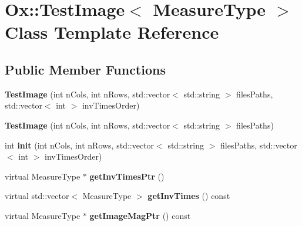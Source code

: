 \hypertarget{class_ox_1_1_test_image}{\section{Ox\-:\-:Test\-Image$<$ Measure\-Type $>$ Class Template Reference}
\label{class_ox_1_1_test_image}
}
\subsection*{Public Member Functions}
\begin{DoxyCompactItemize}
\item 
\hypertarget{class_ox_1_1_test_image_a3b5ceff06d34b2ebd4a4ff215e156088}{{\bfseries Test\-Image} (int n\-Cols, int n\-Rows, std\-::vector$<$ std\-::string $>$ files\-Paths, std\-::vector$<$ int $>$ inv\-Times\-Order)}\label{class_ox_1_1_test_image_a3b5ceff06d34b2ebd4a4ff215e156088}

\item 
\hypertarget{class_ox_1_1_test_image_a794b321a180a2b19d88efc316e0d47aa}{{\bfseries Test\-Image} (int n\-Cols, int n\-Rows, std\-::vector$<$ std\-::string $>$ files\-Paths)}\label{class_ox_1_1_test_image_a794b321a180a2b19d88efc316e0d47aa}

\item 
\hypertarget{class_ox_1_1_test_image_aa802ece1484e88fd748b462c6e2a6cf9}{int {\bfseries init} (int n\-Cols, int n\-Rows, std\-::vector$<$ std\-::string $>$ files\-Paths, std\-::vector$<$ int $>$ inv\-Times\-Order)}\label{class_ox_1_1_test_image_aa802ece1484e88fd748b462c6e2a6cf9}

\item 
\hypertarget{class_ox_1_1_test_image_a6dda2e0b1c2f9d285a29007a14441be3}{virtual Measure\-Type $\ast$ {\bfseries get\-Inv\-Times\-Ptr} ()}\label{class_ox_1_1_test_image_a6dda2e0b1c2f9d285a29007a14441be3}

\item 
\hypertarget{class_ox_1_1_test_image_accd975ba34db53a323810f506e0953d1}{virtual std\-::vector$<$ Measure\-Type $>$ {\bfseries get\-Inv\-Times} () const }\label{class_ox_1_1_test_image_accd975ba34db53a323810f506e0953d1}

\item 
\hypertarget{class_ox_1_1_test_image_a825435d601877f1595b5b04d8f2df2c1}{virtual Measure\-Type $\ast$ {\bfseries get\-Image\-Mag\-Ptr} () const }\label{class_ox_1_1_test_image_a825435d601877f1595b5b04d8f2df2c1}


\end{DoxyCompactItemize}
